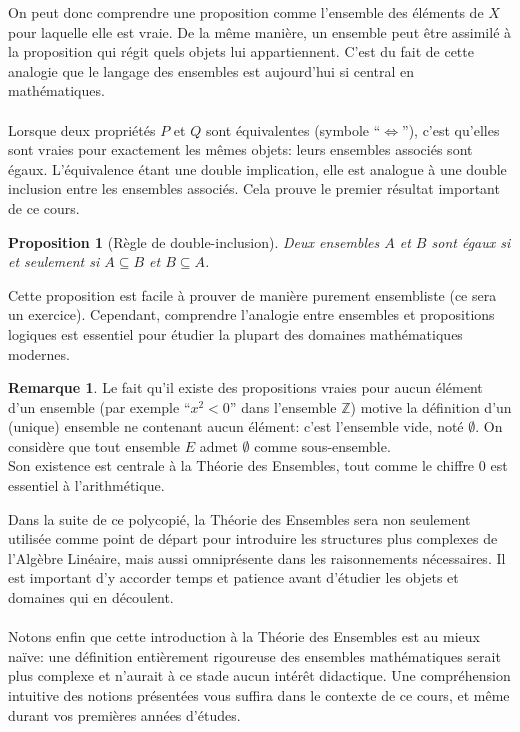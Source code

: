 \documentclass[oneside,12pt,french,table]{book}
\newtheorem{prop}{Proposition}[section]
\theoremstyle{definition}
\theoremstyle{definition}
\theoremstyle{definition}
\newtheorem*{remark}{Remarque}
\begin{document}
On peut donc comprendre une proposition comme l'ensemble des éléments de $X$ pour laquelle elle est vraie. De la même manière, un ensemble peut être assimilé à la proposition qui régit quels objets lui appartiennent. C'est du fait de cette analogie que le langage des ensembles est aujourd'hui si central en mathématiques. \\ \\
Lorsque deux propriétés $P$ et $Q$ sont équivalentes (symbole ``$\iff$''), c'est qu'elles sont vraies pour exactement les mêmes objets: leurs ensembles associés sont égaux. L'équivalence étant une double implication, elle est analogue à une double inclusion entre les ensembles associés. Cela prouve le premier résultat important de ce cours.
\begin{prop}[Règle de double-inclusion]
Deux ensembles $A$ et $B$ sont égaux si et seulement si $A \subseteq B$ et $B \subseteq A$.
\end{prop}
\noindent
Cette proposition est facile à prouver de manière purement ensembliste (ce sera un exercice). Cependant, comprendre l'analogie entre ensembles et propositions logiques est essentiel pour étudier la plupart des domaines mathématiques modernes. 
\begin{remark}
Le fait qu'il existe des propositions vraies pour aucun élément d'un ensemble (par exemple ``$x^2 < 0$'' dans l'ensemble $\mathbb{Z}$) motive la définition d'un (unique) ensemble ne contenant aucun élément: c'est l'ensemble vide, noté $\emptyset$. On considère que tout ensemble $E$ admet $\emptyset$ comme sous-ensemble. \\
Son existence est centrale à la Théorie des Ensembles, tout comme le chiffre $0$ est essentiel à l'arithmétique.
\end{remark}
\noindent
Dans la suite de ce polycopié, la Théorie des Ensembles sera non seulement utilisée comme point de départ pour introduire les structures plus complexes de l'Algèbre Linéaire, mais aussi omniprésente dans les raisonnements nécessaires. Il est important d'y accorder temps et patience avant d'étudier les objets et domaines qui en découlent. \\
\\
Notons enfin que cette introduction à la Théorie des Ensembles est au mieux naïve: une définition entièrement rigoureuse des ensembles mathématiques serait plus complexe et n'aurait à ce stade aucun intérêt didactique. Une compréhension intuitive des notions présentées vous suffira dans le contexte de ce cours, et même durant vos premières années d'études.
\end{document}
